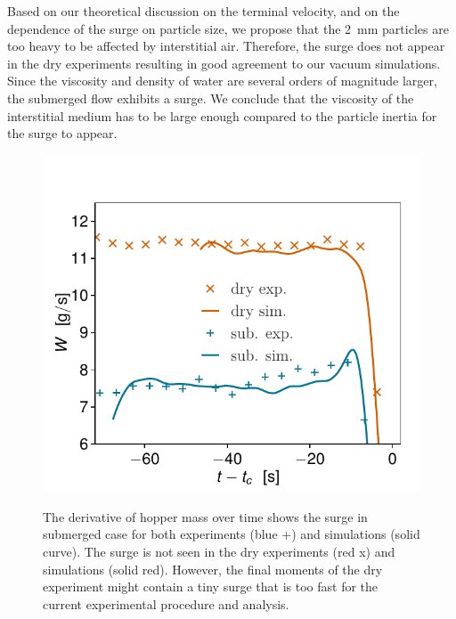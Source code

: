 \documentclass[twoside,twocolumn,9pt]{article}
\begin{document}
Based on our theoretical discussion on the terminal velocity, and on the dependence of the surge on particle size, we propose that the 2~mm particles are too heavy to be affected by interstitial air. Therefore, the surge does not appear in the dry experiments resulting in good agreement to our vacuum simulations. Since the viscosity and density of water are several orders of magnitude larger, the submerged flow exhibits a surge. We conclude that the viscosity of the interstitial medium has to be large enough compared to the particle inertia for the surge to appear.
%
\begin{figure}[!t]%
 \includegraphics[width=\columnwidth]{fig9-w_vs_t.pdf}\\
 \caption{The derivative of hopper mass over time shows the surge in submerged case for both experiments (blue +) and simulations (solid curve). The surge is not seen in the dry experiments (red x) and simulations (solid red). However, the final moments of the dry experiment might contain a tiny surge that is too fast for the current experimental procedure and analysis.}
 \label{fig:derivated_data}
\end{figure}
\end{document}
